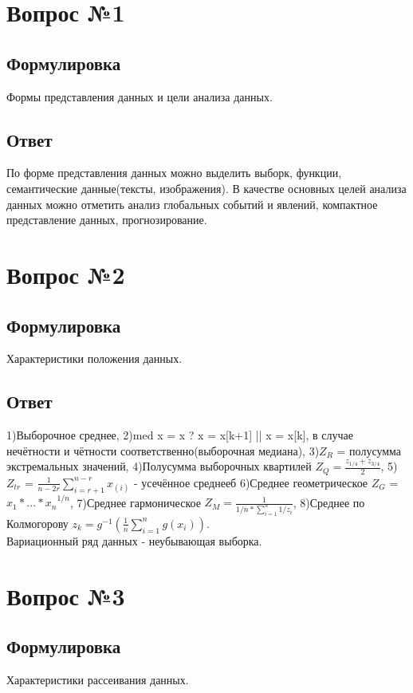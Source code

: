 \documentclass[a4]{article}
\begin{document}
\tableofcontents
\newpage

	\section{Вопрос №1}
	\subsection*{Формулировка}
	Формы представления данных и цели анализа данных.
	\subsection*{Ответ}
	По форме представления данных можно выделить выборк, функции, семантические данные(тексты, изображения). В качестве основных целей анализа данных можно отметить анализ глобальных событий и явлений, компактное представление данных, прогнозирование.
	
	\section{Вопрос №2}
	\subsection*{Формулировка}
	Характеристики положения данных.
	\subsection*{Ответ}
	1)Выборочное среднее, 2)med x = x ? x = x[k+1] || x = x[k], в случае нечётности и чётности соответственно(выборочная медиана), 3)$Z_R$ = полусумма экстремальных значений, 4)Полусумма выборочных квартилей $Z_Q = \frac{z_{1/4} + z_{3/4}}{2}$, 5)$Z_{tr}$ = $\frac{1}{n - 2r} \sum_{i = r+1}^{n-r} x_{(i)}$ - усечённое среднееб 6)Среднее геометрическое $Z_G$ = ${x_1 *...* x_n}^{1/n}$, 7)Среднее гармоническое $Z_M = \frac{1}{1/n * \sum_{i = 1}^{n}1/z_i}$, 8)Среднее по Колмогорову $z_k = g^{-1} (\frac{1}{n} \sum_{i = 1}^n g(x_i))$.\\
	Вариационный ряд данных - неубывающая выборка.
	
	\section{Вопрос №3}
	\subsection*{Формулировка}
	Характеристики рассеивания данных.
\end{document}
